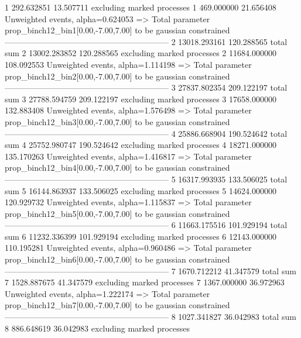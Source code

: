1          292.632851      13.507711       excluding marked processes    
1          469.000000      21.656408       Unweighted events, alpha=0.624053
  => Total parameter prop_binch12_bin1[0.00,-7.00,7.00] to be gaussian constrained
------------------------------------------------------------
2          13018.293161    120.288565      total sum                     
2          13002.283852    120.288565      excluding marked processes    
2          11684.000000    108.092553      Unweighted events, alpha=1.114198
  => Total parameter prop_binch12_bin2[0.00,-7.00,7.00] to be gaussian constrained
------------------------------------------------------------
3          27837.802354    209.122197      total sum                     
3          27788.594759    209.122197      excluding marked processes    
3          17658.000000    132.883408      Unweighted events, alpha=1.576498
  => Total parameter prop_binch12_bin3[0.00,-7.00,7.00] to be gaussian constrained
------------------------------------------------------------
4          25886.668904    190.524642      total sum                     
4          25752.980747    190.524642      excluding marked processes    
4          18271.000000    135.170263      Unweighted events, alpha=1.416817
  => Total parameter prop_binch12_bin4[0.00,-7.00,7.00] to be gaussian constrained
------------------------------------------------------------
5          16317.993935    133.506025      total sum                     
5          16144.863937    133.506025      excluding marked processes    
5          14624.000000    120.929732      Unweighted events, alpha=1.115837
  => Total parameter prop_binch12_bin5[0.00,-7.00,7.00] to be gaussian constrained
------------------------------------------------------------
6          11663.175516    101.929194      total sum                     
6          11232.336399    101.929194      excluding marked processes    
6          12143.000000    110.195281      Unweighted events, alpha=0.960486
  => Total parameter prop_binch12_bin6[0.00,-7.00,7.00] to be gaussian constrained
------------------------------------------------------------
7          1670.712212     41.347579       total sum                     
7          1528.887675     41.347579       excluding marked processes    
7          1367.000000     36.972963       Unweighted events, alpha=1.222174
  => Total parameter prop_binch12_bin7[0.00,-7.00,7.00] to be gaussian constrained
------------------------------------------------------------
8          1027.341827     36.042983       total sum                     
8          886.648619      36.042983       excluding marked processes    
